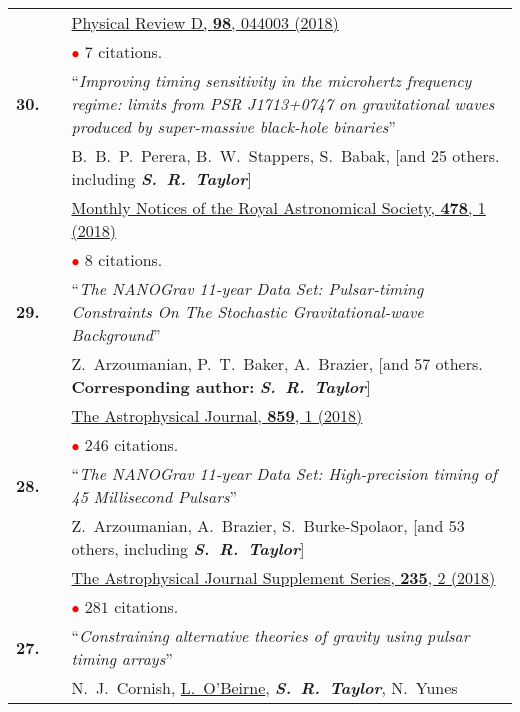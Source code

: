 \documentclass[11pt,letterpaper,sans]{moderncv}
\begin{document}
{\begin{longtable}{rp{0.3cm}p{15.8cm}}
&& \href{https://journals.aps.org/prd/abstract/10.1103/PhysRevD.98.044003}{{\color{color1} Physical Review D, \textbf{98}, 044003 (2018)}}  \\
&& \textcolor{red}{$\bullet$} $7$ citations. \vspace{0.09cm}\\
\textbf{30.} & & ``\textit{Improving timing sensitivity in the microhertz frequency regime: limits from PSR J1713+0747 on gravitational waves produced by super-massive black-hole binaries}'' \\ 
&&B.~B.~P.~Perera, B.~W.~Stappers, S.~Babak, [and 25 others. including \textit{\textbf{S.~R.~Taylor}}]\\
&& \href{https://academic.oup.com/mnras/article-abstract/478/1/218/4990951?redirectedFrom=fulltext}{{\color{color1} Monthly Notices of the Royal Astronomical Society, \textbf{478}, 1 (2018)}}  \\
&& \textcolor{red}{$\bullet$} $8$ citations. \vspace{0.09cm}\\
\textbf{29.} & & ``\textit{The NANOGrav 11-year Data Set: Pulsar-timing Constraints On The Stochastic Gravitational-wave Background}'' \\ 
&&Z.~Arzoumanian, P.~T.~Baker, A.~Brazier, [and 57 others. \textbf{Corresponding author:} \textit{\textbf{S.~R.~Taylor}}]\\
&& \href{http://iopscience.iop.org/article/10.3847/1538-4357/aabd3b/meta}{{\color{color1} The Astrophysical Journal, \textbf{859}, 1 (2018)}}  \\
&& \textcolor{red}{$\bullet$} $246$ citations. \vspace{0.09cm}\\
\textbf{28.} & & ``\textit{The NANOGrav 11-year Data Set: High-precision timing of 45 Millisecond Pulsars}'' \\ 
&&Z.~Arzoumanian, A.~Brazier, S.~Burke-Spolaor, [and 53 others, including \textit{\textbf{S.~R.~Taylor}}]\\
&& \href{http://iopscience.iop.org/article/10.3847/1538-4365/aab5b0/meta}{{\color{color1} The Astrophysical Journal Supplement Series, \textbf{235}, 2 (2018)}}  \\
&& \textcolor{red}{$\bullet$} $281$ citations. \vspace{0.09cm}\\
\textbf{27.} & & ``\textit{Constraining alternative theories of gravity using pulsar timing arrays}'' \\ 
&&N.~J.~Cornish, \underline{L.~O'Beirne}, \textit{\textbf{S.~R.~Taylor}}, N.~Yunes\\

\end{longtable}}
\end{document}
